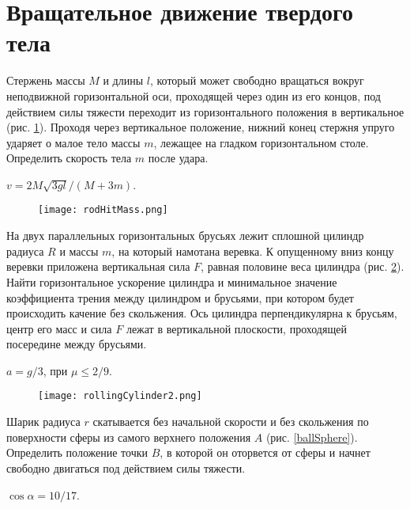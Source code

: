 \section{Вращательное движение твердого тела}

\begin{ex} %
Стержень массы $M$ и длины $l$, который может свободно вращаться вокруг неподвижной горизонтальной оси, проходящей через один из его концов, под действием силы тяжести переходит из горизонтального положения в вертикальное (рис. \ref{rodHitMass}). Проходя через вертикальное положение, нижний конец стержня упруго ударяет о малое тело массы $m$, лежащее на гладком горизонтальном столе. Определить скорость тела $m$ после удара.
\begin{ans}
$v = 2M\sqrt{3gl}/(M+3m)$.
\end{ans}
\end{ex}	

\begin{figure}[h]
\centering
\texttt{[image: rodHitMass.png]}
\caption{}
\label{rodHitMass}
\end{figure}

\begin{ex} %
На двух параллельных горизонтальных брусьях лежит сплошной цилиндр радиуса $R$ и массы $m$, на который намотана веревка. К опущенному вниз концу веревки приложена вертикальная сила $F$, равная половине веса цилиндра (рис. \ref{rollingCylinder2}). Найти горизонтальное ускорение цилиндра и минимальное значение коэффициента трения между цилиндром и брусьями, при котором будет происходить качение без скольжения. Ось цилиндра перпендикулярна к брусьям, центр его масс и сила $F$ лежат в вертикальной плоскости, проходящей посередине между брусьями.
\begin{ans}
$a = g/3$, при $\mu \leq 2/9$.
\end{ans}
\end{ex}	

\begin{figure}[h]
\centering
\texttt{[image: rollingCylinder2.png]}
\caption{}
\label{rollingCylinder2}
\end{figure}

\begin{ex} %
Шарик радиуса $r$ скатывается без начальной скорости и без скольжения по поверхности сферы из самого верхнего положения $A$ (рис. \ref{ballSphere}). Определить положение точки $B$, в которой он оторвется от сферы и начнет свободно двигаться под действием силы тяжести.
\begin{ans}
$\cos \alpha = 10/17$.
\end{ans}
\end{ex}	

